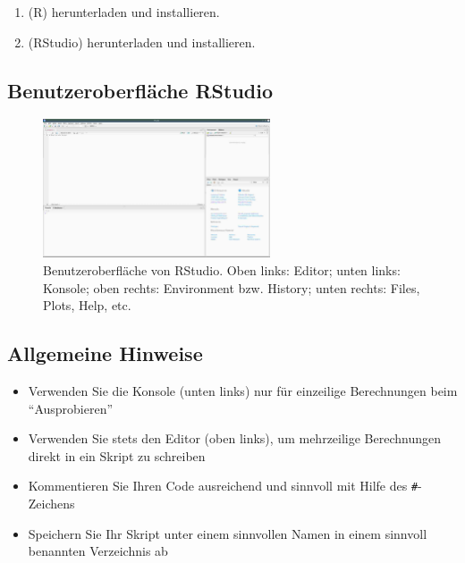 \documentclass[
]{book}
\providecommand{\tightlist}{%
  \setlength{\itemsep}{0pt}\setlength{\parskip}{0pt}}
\begin{document}
\begin{enumerate}
\def\labelenumi{\arabic{enumi}.}
\item
  (R) herunterladen und installieren.
\item
  (RStudio) herunterladen und installieren.
\end{enumerate}

\hypertarget{benutzeroberfluxe4che-rstudio}{%
\subsection*{Benutzeroberfläche RStudio}\label{benutzeroberfluxe4che-rstudio}}

\begin{figure}
\centering
\includegraphics[width=0.6\textwidth,height=\textheight]{imgs/RStudio_003.jpg}
\caption{Benutzeroberfläche von RStudio. Oben links: Editor; unten links: Konsole; oben rechts: Environment bzw. History; unten rechts: Files, Plots, Help, etc.}
\end{figure}

\hypertarget{allgemeine-hinweise}{%
\subsection*{Allgemeine Hinweise}\label{allgemeine-hinweise}}

\begin{itemize}
\tightlist
\item
  Verwenden Sie die Konsole (unten links) nur für einzeilige Berechnungen beim ``Ausprobieren''
\item
  Verwenden Sie stets den Editor (oben links), um mehrzeilige Berechnungen direkt in ein Skript zu schreiben
\item
  Kommentieren Sie Ihren Code ausreichend und sinnvoll mit Hilfe des \texttt{\#}-Zeichens
\item
  Speichern Sie Ihr Skript unter einem sinnvollen Namen in einem sinnvoll benannten Verzeichnis ab
\end{itemize}
\end{document}
